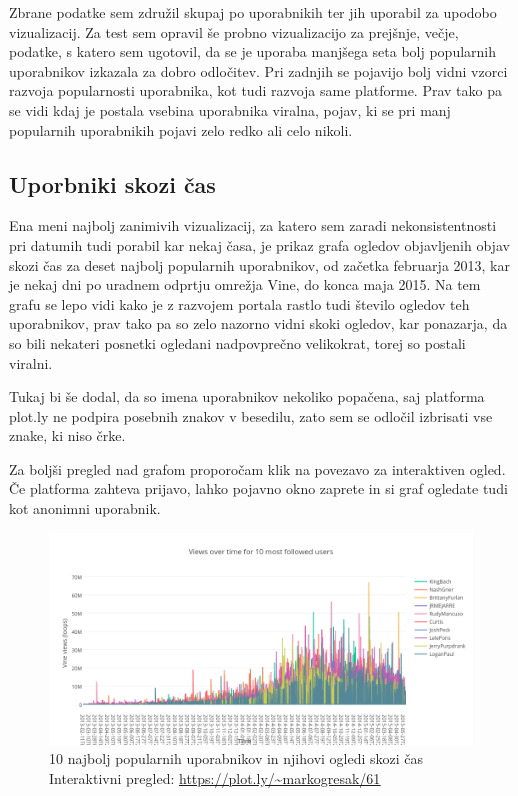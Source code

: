 \documentclass[a4paper,11pt]{article}
\begin{document}
Zbrane podatke sem združil skupaj po uporabnikih ter jih uporabil za upodobo vizualizacij. Za test sem opravil še probno vizualizacijo za prejšnje, večje, podatke, s katero sem ugotovil, da se je uporaba manjšega seta bolj popularnih uporabnikov izkazala za dobro odločitev. Pri zadnjih se pojavijo bolj vidni vzorci razvoja popularnosti uporabnika, kot tudi razvoja same platforme. Prav tako pa se vidi kdaj je postala vsebina uporabnika viralna, pojav, ki se pri manj popularnih uporabnikih pojavi zelo redko ali celo nikoli.

\subsection{Uporbniki skozi čas}

Ena meni najbolj zanimivih vizualizacij, za katero sem zaradi nekonsistentnosti pri datumih tudi porabil kar nekaj časa, je prikaz grafa ogledov objavljenih objav skozi čas za deset najbolj popularnih uporabnikov, od začetka februarja 2013, kar je nekaj dni po uradnem odprtju omrežja Vine, do konca maja 2015. Na tem grafu se lepo vidi kako je z razvojem portala rastlo tudi število ogledov teh uporabnikov, prav tako pa so zelo nazorno vidni skoki ogledov, kar ponazarja, da so bili nekateri posnetki ogledani nadpovprečno velikokrat, torej so postali viralni.
\par
Tukaj bi še dodal, da so imena uporabnikov nekoliko popačena, saj platforma plot.ly ne podpira posebnih znakov v besedilu, zato sem se odločil izbrisati vse znake, ki niso črke.
\par
Za boljši pregled nad grafom proporočam klik na povezavo za interaktiven ogled. Če platforma zahteva prijavo, lahko pojavno okno zaprete in si graf ogledate tudi kot anonimni uporabnik.

\pagebreak

\begin{figure}[htbp]
  \begin{center}
    \includegraphics[width=\textwidth,height=\textheight,keepaspectratio]{figures/views-over-time.png}
    \caption{10 najbolj popularnih uporabnikov in njihovi ogledi skozi čas\\
    Interaktivni pregled: \href{https://plot.ly/~markogresak/61}{\underline{https://plot.ly/{\sim}markogresak/61}}}
  \end{center}
\end{figure}
\end{document}
